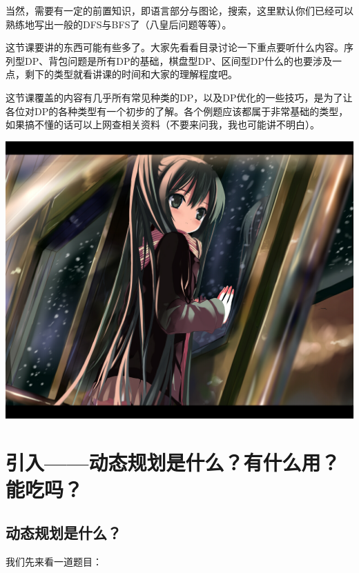 \documentclass{article}
\theoremstyle{nonumberplain}
\begin{document}
当然，需要有一定的前置知识，即语言部分与图论，搜索，这里默认你们已经可以熟练地写出一般的DFS与BFS了（八皇后问题等等）。

这节课要讲的东西可能有些多了。大家先看看目录讨论一下重点要听什么内容。序列型DP、背包问题是所有DP的基础，棋盘型DP、区间型DP什么的也要涉及一点，剩下的类型就看讲课的时间和大家的理解程度吧。

这节课覆盖的内容有几乎所有常见种类的DP，以及DP优化的一些技巧，是为了让各位对DP的各种类型有一个初步的了解。各个例题应该都属于非常基础的类型，如果搞不懂的话可以上网查相关资料（不要来问我，我也可能讲不明白）。

\begin{center}\includegraphics[scale=0.5]{2583887_p0.jpg}\end{center}
\newpage

\section{引入------动态规划是什么？有什么用？能吃吗？}
\subsection{动态规划是什么？}
我们先来看一道题目：
\end{document}

